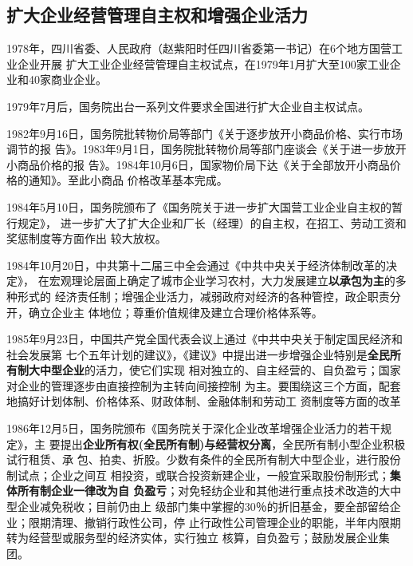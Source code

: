 

\subsection{扩大企业经营管理自主权和增强企业活力}

1978年，四川省委、人民政府（赵紫阳时任四川省委第一书记）在6个地方国营工业企业开展
扩大工业企业经营管理自主权试点，在1979年1月扩大至100家工业企业和40家商业企业。

1979年7月后，国务院出台一系列文件要求全国进行扩大企业自主权试点。

1982年9月16日，国务院批转物价局等部门《关于逐步放开小商品价格、实行市场调节的报
告》。1983年9月1日，国务院批转物价局等部门座谈会《关于进一步放开小商品价格的报
告》。1984年10月6日，国家物价局下达《关于全部放开小商品价格的通知》。至此小商品
价格改革基本完成。\cite[442-443]{fengyunshi1b}


1984年5月10日，国务院颁布了《国务院关于进一步扩大国营工业企业自主权的暂行规定》，
进一步扩大了扩大企业和厂长（经理）的自主权，在招工、劳动工资和奖惩制度等方面作出
较大放权。

1984年10月20日，中共第十二届三中全会通过《中共中央关于经济体制改革的决定》，
在宏观理论层面上确定了城市企业学习农村，大力发展建立\textbf{以承包为主}的多种形式的
经济责任制；增强企业活力，减弱政府对经济的各种管控，政企职责分开，确立企业主
体地位；尊重价值规律及建立合理价格体系等。

1985年9月23日，中国共产党全国代表会议上通过《中共中央关于制定国民经济和社会发展第
七个五年计划的建议》，《建议》中提出进一步增强企业特别是\textbf{全民所有制大中型企业}的活力，使它们实现
相对独立的、自主经营的、自负盈亏；国家对企业的管理逐步由直接控制为主转向间接控制
为主。要围绕这三个方面，配套地搞好计划体制、价格体系、财政体制、金融体制和劳动工
资制度等方面的改革

1986年12月5日，国务院颁布《国务院关于深化企业改革增强企业活力的若干规定》，主
要提出\textbf{企业所有权(全民所有制)与经营权分离}，全民所有制小型企业积极试行租赁、承
包、拍卖、折股。少数有条件的全民所有制大中型企业，进行股份制试点；企业之间互
相投资，或联合投资新建企业，一般宜采取股份制形式；\textbf{集体所有制企业一律改为自
  负盈亏}；对免轻纺企业和其他进行重点技术改造的大中型企业减免税收；目前仍由上
级部门集中掌握的30％的折旧基金，要全部留给企业；限期清理、撤销行政性公司，停
止行政性公司管理企业的职能，半年内限期转为经营型或服务型的经济实体，实行独立
核算，自负盈亏；鼓励发展企业集团。

